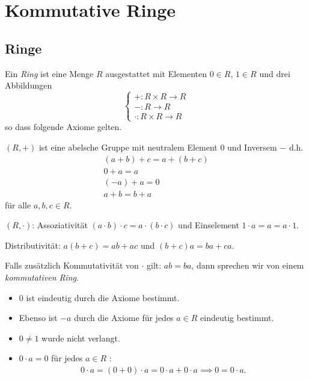 \graphicspath{{Images/}}

\chapter{Kommutative Ringe}

\section{Ringe}

\begin{definition}
	Ein \emph{Ring} ist eine Menge $R$ ausgestattet mit Elementen $0 \in R$, $1 \in R$ und drei Abbildungen
	\[
		\begin{cases}
			+: R \times R \to R\\
			-: R \to R\\
			\cdot: R \times R \to R
		\end{cases}
	\]
	so dass folgende Axiome gelten.

	$(R,+)$ ist eine abelsche Gruppe mit neutralem Element $0$ und Inversem $-$ d.h.
	\begin{gather*}
		(a+b) + c = a + (b+c)\\
		0 + a = a\\
		(-a) + a = 0\\
		a + b = b + a
	\end{gather*}
	für alle $a,b,c \in R$.

	$(R,\cdot)$: Assoziativität $(a\cdot b) \cdot c = a \cdot (b \cdot c)$ und Einselement $1 \cdot a = a = a \cdot 1$.

	Distributivität: $a ( b + c) = ab + ac$ und $(b+c) a = ba + ca$.

	Falls zusätzlich Kommutativität von $\cdot$ gilt: $ab = ba$, dann sprechen wir von einem \emph{kommutativen Ring}.
\end{definition}

\begin{remark}
	\begin{itemize}	
		\item $0$ ist eindeutig durch die Axiome bestimmt. 
		\item Ebenso ist $-a$ durch die Axiome für jedes $a \in R$ eindeutig bestimmt.
		\item $0 \neq 1$ wurde nicht verlangt.
		\item $0 \cdot a = 0$ für jedes $a \in R$ :
			 \begin{align*}
				 0 \cdot a = (0+0) \cdot a = 0\cdot a + 0 \cdot a \implies 0 = 0 \cdot a
			.\end{align*}
	\end{itemize}
\end{remark}

